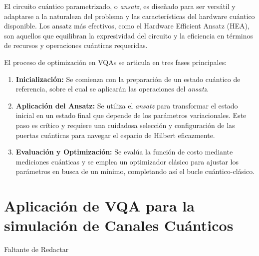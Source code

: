 \documentclass[11pt, spanish, letterpage]{report} %
\newcommand{\1}{\mathbb{1}}
\newcounter{problem}[section]
\begin{document}
El circuito cuántico parametrizado, o \textit{ansatz}, es diseñado para ser versátil y adaptarse a la naturaleza del problema y las características del hardware cuántico disponible. Los ansatz más efectivos, como el Hardware Efficient Ansatz (HEA), son aquellos que equilibran la expresividad del circuito y la eficiencia en términos de recursos y operaciones cuánticas requeridas. \cite{VQA}

El proceso de optimización en VQAs se articula en tres fases principales:
\begin{enumerate}
    \item \textbf{Inicialización:} Se comienza con la preparación de un estado cuántico de referencia, sobre el cual se aplicarán las operaciones del \textit{ansatz}.
    \item \textbf{Aplicación del Ansatz:} Se utiliza el \textit{ansatz} para transformar el estado inicial en un estado final que depende de los parámetros variacionales. Este paso es crítico y requiere una cuidadosa selección y configuración de las puertas cuánticas para navegar el espacio de Hilbert eficazmente.
    \item \textbf{Evaluación y Optimización:} Se evalúa la función de costo mediante mediciones cuánticas y se emplea un optimizador clásico para ajustar los parámetros en busca de un mínimo, completando así el bucle cuántico-clásico.
\end{enumerate}





\section{Aplicación de VQA para la simulación de Canales Cuánticos}
Faltante de Redactar







\end{document}
